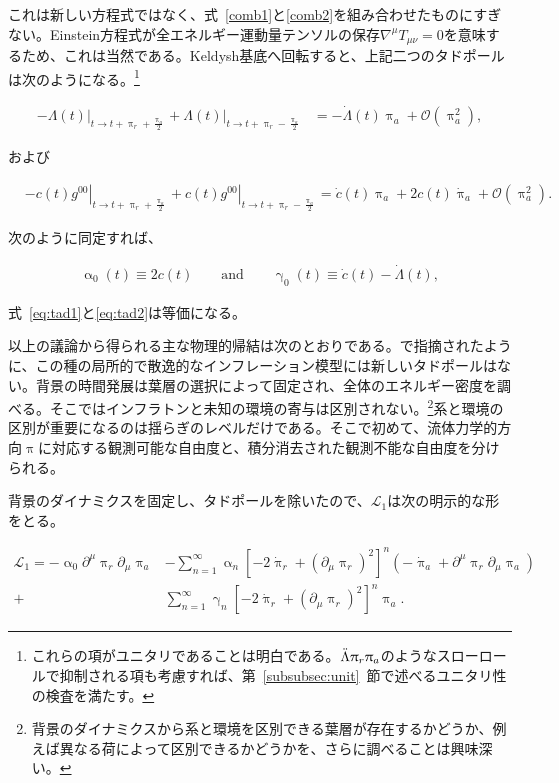\documentclass[a4paper,11pt]{ltjsarticle}
\numberwithin{equation}{section}
\newcommand{\Eqs}[1]{Eqs.~(\ref{#1})}
\newcommand{\Sec}[1]{Sec.~\ref{#1}}
\renewcommand{\Eqs}[1]{式~\eqref{#1}}
\renewcommand{\Sec}[1]{第~\ref{#1}~節}
\begin{document}
\begin{tcolorbox}[enhanced,breakable,skin first=enhanced,skin middle=enhanced,skin last=enhanced,before upper={\parindent15pt},]{}
これは新しい方程式ではなく、\Eqs{comb1}と\eqref{comb2}を組み合わせたものにすぎない。Einstein方程式が全エネルギー運動量テンソルの保存$\nabla^\mu T_{\mu\nu}=0$を意味するため、これは当然である。Keldysh基底へ回転すると、上記二つのタドポールは次のようになる。\footnote{これらの項がユニタリであることは明白である。$\Ddot{\Lambda}\uppi_r\uppi_a$のようなスローロールで抑制される項も考慮すれば、\Sec{subsubsec:unit}で述べるユニタリ性の検査を満たす。}

\begin{align}
              -\left.\Lambda(t)\right|_{t\rightarrow t + \uppi_r + \frac{\uppi_a}{2}} + \left.\Lambda(t)\right|_{t\rightarrow t + \uppi_r - \frac{\uppi_a}{2}}  &= - \dot{\Lambda}(t) \uppi_a + \mathcal{O}(\uppi_a^2),
        \end{align}

および

\begin{align}
            &-\left.c(t) g^{00}\right|_{t\rightarrow t + \uppi_r + \frac{\uppi_a}{2}} + \left.c(t) g^{00}\right|_{t\rightarrow t + \uppi_r - \frac{\uppi_a}{2}}    =  \dot{c}(t) \uppi_a + 2 c(t) \dot{\uppi}_a + \mathcal{O}(\uppi_a^2).
        \end{align}

次のように同定すれば、

\begin{align}\label{eq:tadpole}
            \upalpha_0(t) \equiv 2 c(t) \qquad \mathrm{and} \qquad \upgamma_0 (t)\equiv  \dot{c}(t) - \dot{\Lambda}(t),
        \end{align}

\Eqs{eq:tad1}と\eqref{eq:tad2}は等価になる。
\end{tcolorbox}

以上の議論から得られる主な物理的帰結は次のとおりである。\cite{LopezNacir:2011kk}で指摘されたように、この種の局所的で散逸的なインフレーション模型には新しいタドポールはない。背景の時間発展は葉層の選択によって固定され、全体のエネルギー密度を調べる。そこではインフラトンと未知の環境の寄与は区別されない。\footnote{背景のダイナミクスから系と環境を区別できる葉層が存在するかどうか、例えば異なる荷によって区別できるかどうかを、さらに調べることは興味深い。}系と環境の区別が重要になるのは揺らぎのレベルだけである。そこで初めて、流体力学的方向$\uppi$に対応する観測可能な自由度と、積分消去された観測不能な自由度を分けられる。

背景のダイナミクスを固定し、タドポールを除いたので、$\mathcal{L}_1$は次の明示的な形をとる。

\begin{align}
        \mathcal{L}_1 = - \upalpha_0 \partial^\mu \uppi_{r} \partial_\mu \uppi_{a} &-\sum_{n=1}^\infty \upalpha_n \left[-2 \dot{\uppi}_{r} + \left( \partial_\mu \uppi_{r}\right)^2\right]^{n}\left(-\dot{\uppi}_{a} + \partial^\mu \uppi_{r} \partial_\mu \uppi_{a}\right) \nonumber \\
        +& \sum_{n=1}^\infty \upgamma_n \left[-2 \dot{\uppi}_{r} + \left( \partial_\mu \uppi_{r}\right)^2\right]^n\uppi_{a}.
    \end{align}
\end{document}
